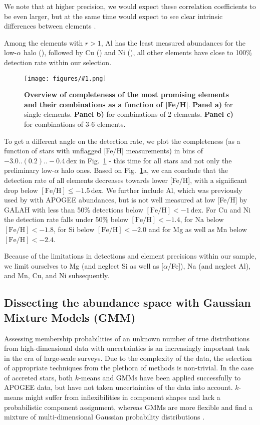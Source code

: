 \documentclass[fleqn,usenatbib]{mnras}
\newcommand{\dex}{\,\mathrm{dex}}	%
\newcommand{\codeicon}{{\faCloudDownload}}
\newcommand{\codelink}[1]{\href{https://github.com/svenbuder/buder_galah_accreted_chemistry/tree/main/figures/#1.ipynb}{\codeicon}\,\,}
\newcommand{\oscaption}[2]{\caption{#2 \codelink{#1}}}
\newcommand{\figurecolumnwidth}[3]{\begin{figure} \centering \texttt{[image: figures/\#1.png]}\oscaption{#2}{#3}\label{fig:#1} \end{figure}}
\begin{document}
We note that at higher precision, we would expect these correlation coefficients to be even larger, but at the same time would expect to see clear intrinsic differences between elements \citep[e.g.][]{Blancato2019, Ting2021}.

Among the elements with $r > 1$, Al has the least measured abundances for the low-$\alpha$ halo (), followed by Cu () and Ni (), all other elements have close to 100\% detection rate within our selection. 

\figurecolumnwidth{Completeness_Combinations}{gaussian_mixture_models}{
\textbf{Overview of completeness of the most promising elements and their combinations as a function of [Fe/H]}.
\textbf{Panel a)} for single elements.
\textbf{Panel b)} for combinations of 2 elements.
\textbf{Panel c)} for combinations of 3-6 elements.
}

To get a different angle on the detection rate, we plot the completeness (as a function of stars with unflagged [Fe/H] measurements) in bins of $-3.0..(0.2)..-0.4\,\mathrm{dex}$ in Fig.~\ref{fig:Completeness_Combinations} - this time for all stars and not only the preliminary low-$\alpha$ halo ones. Based on Fig.~\ref{fig:Completeness_Combinations}a, we can conclude that the detection rate of all elements decreases towards lower [Fe/H], with a significant drop below $\mathrm{[Fe/H]} \leq -1.5\dex$. We further include Al, which was previously used by \citet{Das2020} with APOGEE abundances, but is not well measured at low [Fe/H] by GALAH with less than 50\% detections below $\mathrm{[Fe/H]} < -1\dex$. For Cu and Ni the detection rate falls under 50\% below $\mathrm{[Fe/H]} < -1.4$, for Na below $\mathrm{[Fe/H]} < -1.8$, for Si below $\mathrm{[Fe/H]} < -2.0$ and for Mg as well as Mn below $\mathrm{[Fe/H]} < -2.4$.

Because of the limitations in detections and element precisions within our sample, we limit ourselves to Mg (and neglect Si as well as [$\alpha$/Fe]), Na (and neglect Al), and Mn, Cu, and Ni subsequently.

\subsection{Dissecting the abundance space with Gaussian Mixture Models (GMM)} \label{sec:gaussian_mixture_models}

Assessing membership probabilities of an unknown number of true distributions from high-dimensional data with uncertainties is an increasingly important task in the era of large-scale surveys. Due to the complexity of the data, the selection of appropriate techniques from the plethora of methods is non-trivial. In the case of accreted stars, both $k$-means \citep{Hayes2018, Mackereth2019} and GMMs \citep{Das2020} have been applied successfully to APOGEE data, but have not taken uncertainties of the data into account. $k$-means might suffer from inflexibilities in component shapes and lack a probabilistic component assignment, whereas GMMs are more flexible and find a mixture of multi-dimensional Gaussian probability distributions \citep{VanderPlas2016}.
\end{document}
